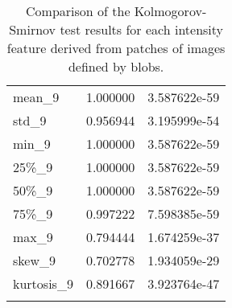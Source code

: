 \begin{longtable}{lrr}
mean\_9     &  1.000000 &  3.587622e-59 \\
std\_9      &  0.956944 &  3.195999e-54 \\
min\_9      &  1.000000 &  3.587622e-59 \\
25\%\_9      &  1.000000 &  3.587622e-59 \\
50\%\_9      &  1.000000 &  3.587622e-59 \\
75\%\_9      &  0.997222 &  7.598385e-59 \\
max\_9      &  0.794444 &  1.674259e-37 \\
skew\_9     &  0.702778 &  1.934059e-29 \\
kurtosis\_9 &  0.891667 &  3.923764e-47 \\
\caption{Comparison of the Kolmogorov-Smirnov test results for each intensity feature derived from patches of images defined by blobs.}
\end{longtable}
